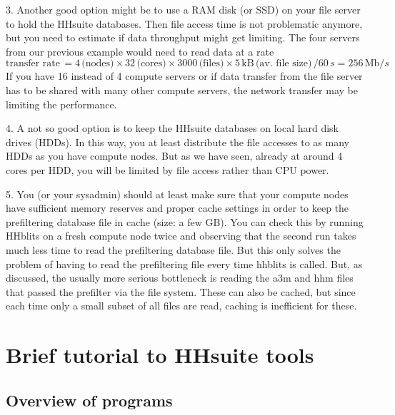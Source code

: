 \documentclass[11pt,a4paper]{article}
\begin{document}
3. Another good option might be to use a RAM disk (or SSD) on your file server to hold the 
HHsuite databases. Then file access time is not problematic anymore, but you need to estimate 
if data throughput might get limiting. The four servers from our previous example would
 need to read data at a rate 
\begin{equation}
\textrm{transfer rate}\, = 4 \, \textrm{(nodes)} \times 32\, \textrm{(cores)} \times 3000\, \textrm{(files)} \times 5\,\textrm{kB}\, \textrm{(av. file size)}\,/ 60 \,s = 256 \,\textrm{Mb}/s
\end{equation}
If you have 16 instead of 4 compute servers or if data transfer from the file server has to be 
shared with many other compute servers, the network transfer may be limiting the performance.

4. A not so good option is to keep the HHsuite databases on local hard disk drives (HDDs). In this 
way, you at least distribute the file accesses to as many HDDs as you have compute nodes. 
But as we have seen, already at around 4 cores per HDD, you will be limited by file access
rather than CPU power.

5. You (or your sysadmin) should at least make sure that your compute nodes have sufficient memory reserves 
and proper cache settings in order to keep the prefiltering database file in cache (size: a few GB).
You can check this by running HHblits on a fresh compute node twice and observing that the 
second run takes much less time to read the prefiltering database file. But this only solves
the problem of having to read the prefiltering file every time hhblits is called. But, as discussed,
the usually more serious bottleneck is reading the a3m and hhm files that passed the prefilter 
via the file system. These can also be cached, but since each time only a small subset of 
all files are read, caching is inefficient for these.


\section{Brief tutorial to HHsuite tools}

\subsection{Overview of programs}
\end{document}
